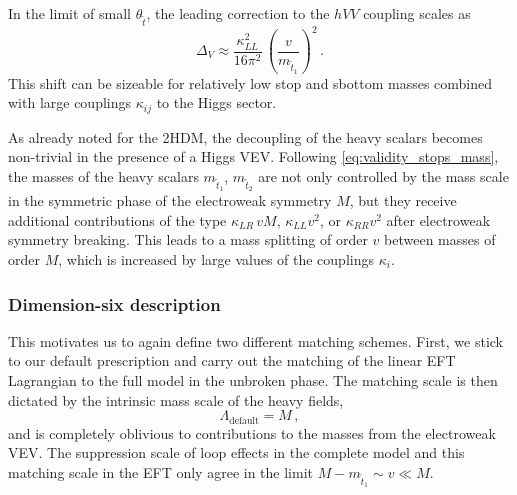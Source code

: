 In the limit of small $\theta_{\tilde{t}}$, the leading correction to
the $hVV$ coupling scales as
%
\begin{equation}
  \Delta_V
  \approx
  \frac{\kappa_{LL}^2}{16 \pi^2} \, \left( \frac{v}{m_{\tilde{t}_{1}}} \right)^2 \,.
  \label{eq:validity_stops_couplings}
\end{equation}
%
This shift can be sizeable for relatively low stop and sbottom masses
combined with large couplings $\kappa_{ij}$ to the Higgs sector.

As already noted for the 2HDM, the decoupling of the heavy scalars
becomes non-trivial in the presence of a Higgs VEV. Following
\autoref{eq:validity_stops_mass}, the masses of the heavy scalars
$m_{\tilde{t}_1}$, $m_{\tilde{t}_2}$ are not only controlled by the
mass scale in the symmetric phase of the electroweak symmetry $M$, but
they receive additional contributions of the type $\kappa_{LR} \, vM$,
$\kappa_{LL} v^2$, or $\kappa_{RR} v^2$ after electroweak symmetry
breaking. This leads to a mass splitting of order $v$ between masses
of order $M$, which is increased by large values of the couplings
$\kappa_{i}$.
%



\subsubsection{Dimension-six description}

This motivates us to again define two different matching
schemes. First, we stick to our default prescription and carry out the
matching of the linear EFT Lagrangian to the full model in the
unbroken phase. The matching scale is then dictated by the intrinsic
mass scale of the heavy fields,
%
\begin{equation}
  \Lambda_{\text{default}} = M \,,
\end{equation}
%
and is completely oblivious to contributions to the masses from the
electroweak VEV. The suppression scale of loop effects in the complete
model and this matching scale in the EFT only agree in the limit
$M - m_{\tilde{t}_{1}} \sim v \ll M$.

